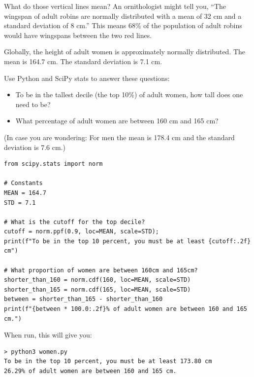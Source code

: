 What do those vertical lines mean?  An ornithologist might tell you, ``The wingspan of adult robins are normally distributed with a mean of 32 cm and a
 standard deviation of 8 cm.''  This means 68\% of the population of adult robins would have wingspans between the two red lines.
 
\begin{Exercise}[title={SciPy Stats}, label=scipy_ppf]

Globally,  the height of adult women is approximately normally distributed. The mean is 164.7 cm. The standard deviation is 7.1 cm.

Use Python and SciPy stats to answer these questions: 

\begin{itemize}
\item To be in the tallest decile (the top 10\%) of adult women,  how tall does one need to be? 

\item What percentage of adult women are between 160 cm and 165 cm?

\end{itemize}

(In case you are wondering: For men the mean is 178.4 cm and the standard deviation is 7.6 cm.)

\end{Exercise}
\begin{Answer}[ref=scipy_ppf]

\begin{verbatim}
from scipy.stats import norm

# Constants
MEAN = 164.7 
STD = 7.1

# What is the cutoff for the top decile?
cutoff = norm.ppf(0.9, loc=MEAN, scale=STD);
print(f"To be in the top 10 percent, you must be at least {cutoff:.2f} cm")

# What proportion of women are between 160cm and 165cm?
shorter_than_160 = norm.cdf(160, loc=MEAN, scale=STD)
shorter_than_165 = norm.cdf(165, loc=MEAN, scale=STD)
between = shorter_than_165 - shorter_than_160
print(f"{between * 100.0:.2f}% of adult women are between 160 and 165 cm.")
\end{verbatim}

When run,  this will give you:

\begin{verbatim}
> python3 women.py
To be in the top 10 percent, you must be at least 173.80 cm
26.29% of adult women are between 160 and 165 cm.
\end{verbatim}

\end{Answer}
